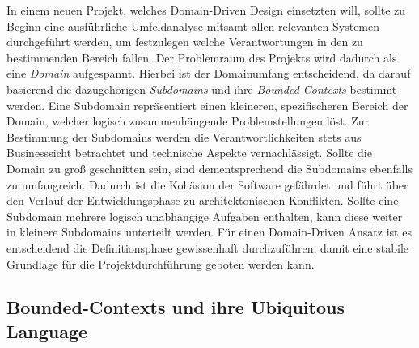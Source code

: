 In einem neuen Projekt, welches Domain-Driven Design einsetzten will, sollte zu Beginn eine ausführliche Umfeldanalyse mitsamt allen relevanten Systemen durchgeführt werden, um festzulegen welche Verantwortungen in den zu bestimmenden Bereich fallen. Der Problemraum des Projekts wird dadurch als eine \emph{Domain} aufgespannt. Hierbei ist der Domainumfang entscheidend, da darauf basierend die dazugehörigen \emph{Subdomains} und ihre \emph{Bounded Contexts} bestimmt werden. Eine Subdomain repräsentiert einen kleineren, spezifischeren Bereich der Domain, welcher logisch zusammenhängende Problemstellungen löst. Zur Bestimmung der Subdomains werden die Verantwortlichkeiten stets aus Businesssicht betrachtet und technische Aspekte vernachlässigt. Sollte die Domain zu groß geschnitten sein, sind dementsprechend die Subdomains ebenfalls zu umfangreich. Dadurch ist die Kohäsion der Software gefährdet und führt über den Verlauf der Entwicklungsphase zu architektonischen Konflikten. Sollte eine Subdomain mehrere logisch unabhängige Aufgaben enthalten, kann diese weiter in kleinere Subdomains unterteilt werden. Für einen Domain-Driven Ansatz ist es entscheidend die Definitionsphase gewissenhaft durchzuführen, damit eine stabile Grundlage für die Projektdurchführung geboten werden kann. 

\subsection{Bounded-Contexts und ihre Ubiquitous Language}

